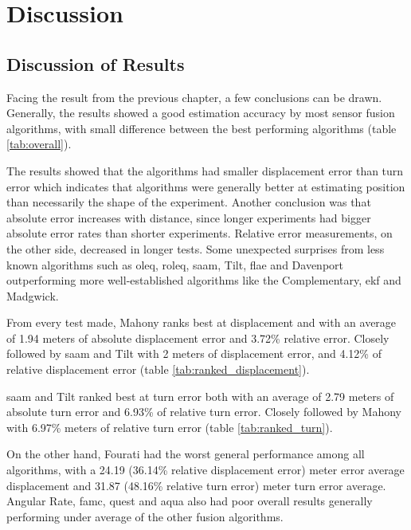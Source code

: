 \section{Discussion}
\subsection{Discussion of Results}
Facing the result from the previous chapter, a few conclusions can be drawn. Generally, the results showed a good estimation accuracy by most sensor fusion algorithms, with small difference between the best performing algorithms (table \ref{tab:overall}).



The results showed that the algorithms had smaller displacement error than turn error which indicates that algorithms were generally better at estimating position than necessarily the shape of the experiment. Another conclusion was that absolute error increases with distance, since longer experiments had bigger absolute error rates than shorter experiments. Relative error measurements, on the other side, decreased in longer tests. Some unexpected surprises from less known algorithms such as \acrshort{oleq}, \acrshort{roleq}, \acrshort{saam}, Tilt, \acrshort{flae} and Davenport outperforming more well-established algorithms like the Complementary, \acrshort{ekf} and Madgwick.

From every test made, Mahony ranks best at displacement and with an average of 1.94 meters of absolute displacement error and 3.72\% relative error. Closely followed by \acrshort{saam} and Tilt with 2 meters of displacement error, and 4.12\% of relative displacement error (table \ref{tab:ranked_displacement}).



\acrshort{saam} and Tilt ranked best at turn error both with an average of 2.79 meters of absolute turn error and 6.93\% of relative turn error. Closely followed by Mahony with 6.97\% meters of relative turn error (table \ref{tab:ranked_turn}).



On the other hand, Fourati had the worst general performance among all algorithms, with a 24.19 (36.14\% relative displacement error) meter error average displacement and 31.87 (48.16\% relative turn error) meter turn error average. Angular Rate, \acrshort{famc}, \acrshort{quest} and \acrshort{aqua} also had poor overall results generally performing under average of the other fusion algorithms.

